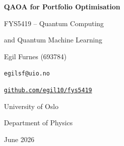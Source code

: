 \begin{center}
{\Huge\bfseries QAOA for Portfolio Optimisation \par}

\vspace{0.4cm}

\begin{minipage}{0.60\linewidth}
\centering
{\large FYS5419 -- Quantum Computing \par and Quantum Machine Learning\par}
\end{minipage}

\vspace{0.45cm}

\begin{minipage}{0.48\linewidth}
\raggedright
{\large Egil Furnes (693784) \par}
\texttt{egilsf@uio.no} \par
\href{https://github.com/egil10/fys5419}{\texttt{github.com/egil10/fys5419}}
\end{minipage}
\hfill
\begin{minipage}{0.48\linewidth}
\raggedleft
University of Oslo \par
Department of Physics \par
June 2026
\end{minipage}
\end{center}
